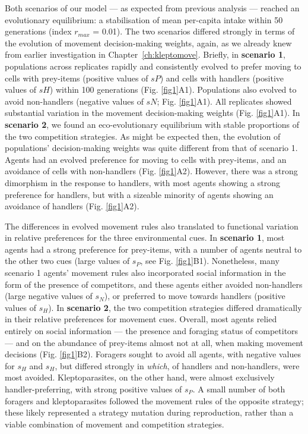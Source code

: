 Both scenarios of our model --- as expected from previous analysis --- reached an evolutionary equilibrium: a stabilisation of mean per-capita intake within 50 generations (index $r_{max}$ = 0.01).
The two scenarios differed strongly in terms of the evolution of movement decision-making weights, again, as we already knew from earlier investigation in Chapter~\ref{ch:kleptomove}.
Briefly, in \textbf{scenario 1}, populations across replicates rapidly and consistently evolved to prefer moving to cells with prey-items (positive values of $sP$) and cells with handlers (positive values of $sH$) within 100 generations (Fig. \ref{fig1}A1).
Populations also evolved to avoid non-handlers (negative values of $sN$; Fig. \ref{fig1}A1).
All replicates showed substantial variation in the movement decision-making weights (Fig. \ref{fig1}A1).
In \textbf{scenario 2}, we found an eco-evolutionary equilibrium with stable proportions of the two competition strategies.
As might be expected then, the evolution of populations' decision-making weights was quite different from that of scenario 1.
Agents had an evolved preference for moving to cells with prey-items, and an avoidance of cells with non-handlers (Fig. \ref{fig1}A2).
However, there was a strong dimorphism in the response to handlers, with most agents showing a strong preference for handlers, but with a sizeable minority of agents showing an avoidance of handlers (Fig. \ref{fig1}A2).

The differences in evolved movement rules also translated to functional variation in relative preferences for the three environmental cues.
In \textbf{scenario 1}, most agents had a strong preference for prey-items, with a number of agents neutral to the other two cues (large values of $s_P$, see Fig. \ref{fig1}B1).
Nonetheless, many scenario 1 agents' movement rules also incorporated social information in the form of the presence of competitors, and these agents either avoided non-handlers (large negative values of $s_N$), or preferred to move towards handlers (positive values of $s_H$).
In \textbf{scenario 2}, the two competition strategies differed dramatically in their relative preferences for movement cues.
Overall, most agents relied entirely on social information --- the presence and foraging status of competitors --- and on the abundance of prey-items almost not at all, when making movement decisions (Fig. \ref{fig1}B2).
Foragers sought to avoid all agents, with negative values for $s_H$ and $s_H$, but differed strongly in \textit{which}, of handlers and non-handlers, were most avoided.
Kleptoparasites, on the other hand, were almost exclusively handler-preferring, with strong positive values of $s_P$.
A small number of both foragers and kleptoparasites followed the movement rules of the opposite strategy; these likely represented a strategy mutation during reproduction, rather than a viable combination of movement and competition strategies.

